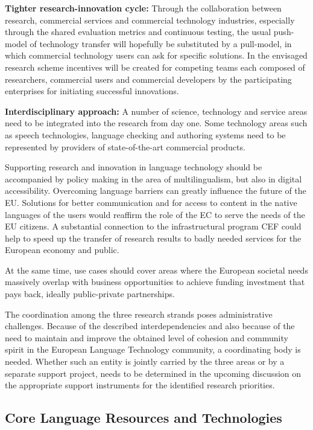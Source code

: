 \documentclass[10pt, plain]{../../metanetpaper}
\begin{document}
\begin{multicols}{2}
\textbf{Tighter research-innovation cycle:} Through the collaboration between research, commercial services and commercial technology industries, especially through the shared evaluation metrics and continuous testing, the usual push-model of technology transfer will hopefully be substituted by a pull-model, in which commercial technology users can ask for specific solutions. In the envisaged research scheme incentives will be created for competing teams each composed of researchers, commercial users and commercial developers by the participating enterprises for initiating successful innovations.

\textbf{Interdisciplinary approach:} A number of science, technology and service areas need to be integrated into the research from day one. Some technology areas such as speech technologies, language checking and authoring systems need to be represented by providers of state-of-the-art commercial products.

Supporting research and innovation in language technology should be accompanied by policy making in the area of multilingualism, but also in digital accessibility. Overcoming language barriers can greatly influence the future of the EU. Solutions for better communication and for access to content in the native languages of the users would reaffirm the role of the EC to serve the needs of the EU citizens. A substantial connection to the infrastructural program CEF could help to speed up the transfer of research results to badly needed services for the European economy and public.
 
At the same time, use cases should cover areas where the European societal needs massively overlap with business opportunities to achieve funding investment that pays back, ideally public-private partnerships.
 
The coordination among the three research strands poses administrative challenges. Because of the described interdependencies and also because of the need to maintain and improve the obtained level of cohesion and community spirit in the European Language Technology community, a coordinating body is needed. Whether such an entity is jointly carried by the three areas or by a separate support project, needs to be determined in the upcoming discussion on the appropriate support instruments for the identified research priorities.

\subsection{Core Language Resources and Technologies}
\label{sec:sharing-resources-and-results}


\end{multicols}
\end{document}
